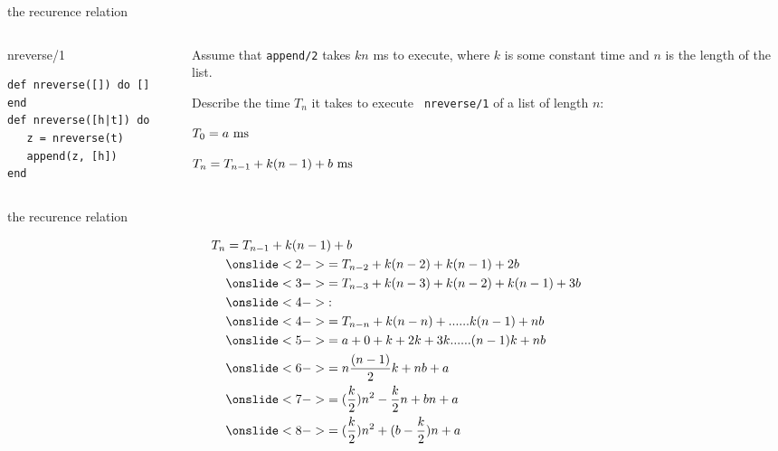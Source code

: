 \begin{frame}[fragile]{the recurence relation}

\begin{columns}
   \begin{column}{.4\linewidth}
     \begin{block}{nreverse/1}
       \begin{verbatim}
def nreverse([]) do [] end
def nreverse([h|t]) do 
   z = nreverse(t)
   append(z, [h])
end
       \end{verbatim}
      \end{block}
    \end{column}
\pause
    \begin{column}{.6\linewidth}
      Assume that {\tt append/2} takes $kn$ ms to execute, where $k$
      is some constant time and $n$ is the length of the list. \pause

      \vspace{5pt} Describe the time $T_n$ it takes to execute {\tt
        nreverse/1} of a list of length $n$: \pause

      \vspace{5pt}      
      $T_0 = a {\rm \ ms}$ \pause
      
      $T_n = T_{n-1} + k(n-1) + b {\rm \ ms}$ \pause
    \end{column}
  \end{columns}
  
\end{frame}


\begin{frame}[fragile]{the recurence relation}

\begin{equation}  
  \begin{split}
T_n & = T_{n-1} + k(n-1) + b \\ 
    & \onslide<2->{ = T_{n-2} + k(n-2) + k(n-1) + 2b }\\
    & \onslide<3->{= T_{n-3} + k(n-3) + k(n-2) + k(n-1) + 3b }\\ 
    & \onslide<4->{:} \\
    & \onslide<4->{= T_{n-n} + k(n-n) + ...... k(n-1)  + nb }\\
    & \onslide<5->{= a + 0 + k + 2k + 3k ...... (n-1)k  + nb  }\\ 
    & \onslide<6->{= n\frac{(n-1)}{2}k + nb + a }\\ 
    & \onslide<7->{= (\frac{k}{2})n^2 - \frac{k}{2}n+ bn + a }\\
    & \onslide<8->{= (\frac{k}{2})n^2 + (b - \frac{k}{2})n+  a }\\    
  \end{split} 
\end{equation}

\end{frame}

